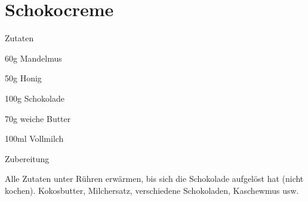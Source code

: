 \chapter*{Schokocreme}
\begin{multicols}{2}
 {\Large Zutaten}
 \begin{Zutaten}
		\item 60g Mandelmus
		\item 50g Honig
		\item 100g Schokolade
		\item 70g weiche Butter
		\item 100ml Vollmilch
		
		
\end{Zutaten}
	
\columnbreak
\end{multicols}

{\Large Zubereitung} \newline
\begin{addmargin}[1cm]{0cm}
	Alle Zutaten unter Rühren erwärmen, bis sich die Schokolade aufgelöst hat (nicht kochen).\newline\newline
	Kokosbutter, Milchersatz, verschiedene Schokoladen, Kaschewmus usw.
	
\end{addmargin}
